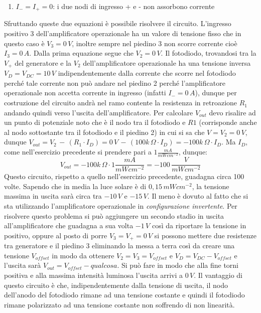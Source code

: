 \documentclass[12pt, a4paper]{report}
\begin{document}
\begin{appendices}
\begin{enumerate}
\begin{enumerate}
        \item $I_{-} = I_{+} = 0$: i due nodi di ingresso + e - non assorbono corrente
    \end{enumerate}
    Sfruttando queste due equazioni è possibile risolvere il circuito. L'ingresso positivo 3 dell'amplificatore operazionale ha un valore di tensione fisso che in questo caso è $V_{3} = 0\,V$, inoltre sempre nel piedino 3 non scorre corrente cioè $I_{3} = 0\,A$. Dalla prima equazione segue che $V_{2} = 0\,V$. Il fotodiodo, trovandosi tra la $V_{+}$ del generatore e la $V_{2}$ dell'amplificatore operazionale ha una tensione inversa $V_{D} = V_{DC} = 10\,V$ indipendentemente dalla corrente che scorre nel fotodiodo perché tale corrente non può andare nel piedino 2 perché l'amplificatore operazionale non accetta corrente in ingresso (infatti $I_{-} = 0\,A$), dunque per costruzione del circuito andrà nel ramo contente la resistenza in retroazione $R_1$ andando quindi verso l'uscita dell'amplificatore. Per calcolare $V_{out}$ devo risalire ad un punto di potenziale noto che è il nodo tra il fotodiodo e $R1$ (corrisponde anche al nodo sottostante tra il fotodiodo e il piedino 2) in cui si sa che $V = V_{2} = 0\,V$, dunque $V_{out} = V_{2} \,-\, ( R_1 \cdot I_{D}) = 0\,V \,-\, (100k\,\Omega \cdot I_{D}) = - 100k\,\Omega \cdot I_{D}$. Ma $I_{D}$, come nell'esercizio precedente si prendere pari a $1 \frac{mA}{mWcm^{-2}}$, dunque:
    \begin{equation*}
        V_{out} = - 100k\,\Omega \cdot 1 \frac{mA}{mWcm^{-2}} = - 100\,\frac{V}{mWcm^{-2}}
    \end{equation*}
    Questo circuito, rispetto a quello nell'esercizio precedente, guadagna circa 100 volte. Sapendo che in media la luce solare è di $0,15\,mWcm^{-2}$, la tensione massima in uscita sarà circa tra $-10\,V$ e $-15\,V$. Il meno è dovuto al fatto che si sta utilizzando l'amplificatore operazionale in \textit{configurazione invertente}. Per risolvere questo problema si può aggiungere un secondo stadio in uscita all'amplificatore che guadagna a sua volta $-1\,V$ così da riportare la tensione in positivo, oppure al posto di porre $V_{3} = V_{+} = 0\,V$ si possono mettere due resistenze tra generatore e il piedino 3 eliminando la messa a terra così da creare una tensione $V_{offset}$ in modo da ottenere $V_{2} = V_{3} = V_{offset}$ e  $V_{D} = V_{DC} - V_{offset}$ e l'uscita sarà $V_{out} = V_{offset} - qualcosa$. Si può fare in modo che alla fine torni positiva e alla massima intensità luminosa l'uscita arrivi a $0\,V$. Il vantaggio di questo circuito è che, indipendentemente dalla tensione di uscita, il nodo dell'anodo del fotodiodo rimane ad una tensione costante e quindi il fotodiodo rimane polarizzato ad una tensione costante non soffrendo di non linearità.
\end{enumerate}

\end{appendices}
\end{document}

